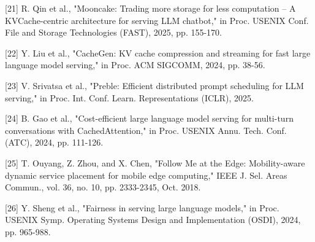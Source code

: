 \documentclass[a4paper,10pt]{ctexart}
\begin{document}
[21] R. Qin et al., "Mooncake: Trading more storage for less computation -- A KVCache-centric architecture for serving LLM chatbot," in Proc. USENIX Conf. File and Storage Technologies (FAST), 2025, pp. 155-170.


[22] Y. Liu et al., "CacheGen: KV cache compression and streaming for fast large language model serving," in Proc. ACM SIGCOMM, 2024, pp. 38-56.


[23] V. Srivatsa et al., "Preble: Efficient distributed prompt scheduling for LLM serving," in Proc. Int. Conf. Learn. Representations (ICLR), 2025.


[24] B. Gao et al., "Cost-efficient large language model serving for multi-turn conversations with CachedAttention," in Proc. USENIX Annu. Tech. Conf. (ATC), 2024, pp. 111-126.


[25] T. Ouyang, Z. Zhou, and X. Chen, "Follow Me at the Edge: Mobility-aware dynamic service placement for mobile edge computing," IEEE J. Sel. Areas Commun., vol. 36, no. 10, pp. 2333-2345, Oct. 2018.


[26] Y. Sheng et al., "Fairness in serving large language models," in Proc. USENIX Symp. Operating Systems Design and Implementation (OSDI), 2024, pp. 965-988.
\end{document}
